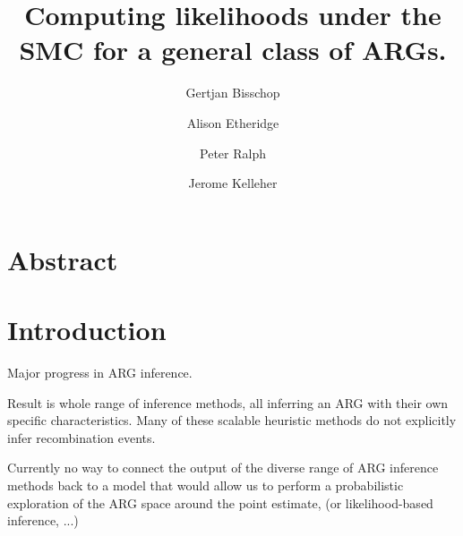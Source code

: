 \documentclass{article}
\begin{document}
\linenumbers
\title{Computing likelihoods under the SMC for a general class of ARGs.}

\author[1, $\dagger$]{Gertjan Bisschop}

\author[2]{Alison Etheridge}
\author[3]{Peter Ralph}

\author[1]{Jerome Kelleher}

\maketitle


\section{Abstract}

\section{Introduction}


Major progress in ARG inference. 

Result is whole range of inference methods, all inferring an ARG with their own specific 
characteristics. %
Many of these scalable heuristic methods do not explicitly infer recombination events.


Currently no way to connect the output of the diverse range of ARG inference methods back 
to a model that would allow us to perform a probabilistic exploration of the 
ARG space around the point estimate, (or likelihood-based inference, ...)




\end{document}
